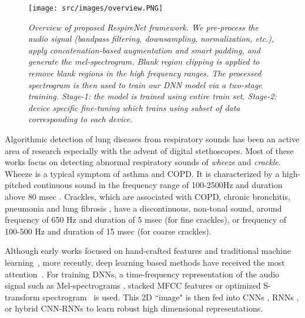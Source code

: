 \documentclass{article}
\newcommand{\method}{\textit{RespireNet}}
\begin{document}
\begin{figure}[t]
\begin{center}
    \centering
    \texttt{[image: src/images/overview.PNG]}
\end{center}
\vspace{-5mm}
    \caption{\textit{Overview of proposed \method{} framework. We pre-process the audio signal (bandpass filtering, downsampling, normalization, etc.), apply concatenation-based augmentation and smart padding, and generate the mel-spectrogram. Blank region clipping is applied to remove blank regions in the high frequency ranges. The processed spectrogram is then used to train our DNN model via a two-stage training. Stage-1: the model is trained using entire train set. Stage-2: device specific fine-tuning which trains using subset of data corresponding to each device.}} 
    \label{fig:framework}
\vspace{-5mm}
\end{figure}

Algorithmic detection of lung diseases from respiratory sounds has been an active area of research \citep{polat_04, reichert_08}
especially with the advent of digital stethoscopes. Most of these works focus on detecting abnormal respiratory sounds of \textit{wheeze} and \textit{crackle}. Wheeze is a typical symptom of asthma and COPD. It is characterized by a high-pitched continuous sound in the frequency range of 100-2500Hz and duration above 80 msec \citep{lungausc_14, analysis_08}. Crackles, which are associated with COPD, chronic bronchitis, pneumonia and lung fibrosis \citep{analysis_11, automaticar_17}, have a discontinuous, non-tonal sound, around frequency of 650 Hz and duration of 5 msec (for fine crackles), or frequency of 100-500 Hz and duration of 15 msec (for coarse crackles).

Although early works focused on hand-crafted features and traditional machine learning~\cite{jako_18, chambres_18}, more recently, deep learning based methods have received the most attention~\cite{noise_rnn_koch_18,acharya_20, lungrn_20}.
For training DNNs, a time-frequency representation of the audio signal such as Mel-spectrograms \cite{shi_vggish_19, liu_detection_19, acharya_20}, stacked MFCC features \cite{shi_vggish_19, murat_17, perna_cnn_18, messner_18, noise_rnn_koch_18} or optimized S-transform spectrogram~\cite{triple_class_chen_19} is used. This 2D ``image" is then fed into CNNs \cite{perna_cnn_18, murat_17}, RNNs \cite{deepap_perna_19, noise_rnn_koch_18}, or hybrid CNN-RNNs \cite{acharya_20} to learn robust high dimensional representations.
\end{document}
